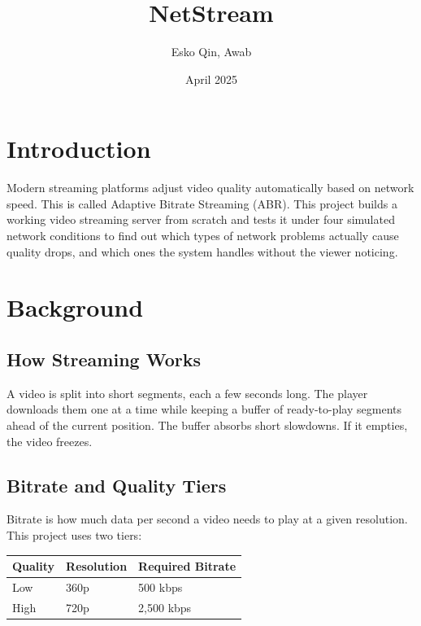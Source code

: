 \documentclass[12pt]{article}
\title{\textbf{NetStream}}
\author{Esko Qin, Awab}
\date{April 2025}
\begin{document}
\maketitle
\tableofcontents
\newpage

\section{Introduction}

Modern streaming platforms adjust video quality automatically based on network speed. This is called Adaptive Bitrate Streaming (ABR). This project builds a working video streaming server from scratch and tests it under four simulated network conditions to find out which types of network problems actually cause quality drops, and which ones the system handles without the viewer noticing.

\section{Background}

\subsection{How Streaming Works}

A video is split into short segments, each a few seconds long. The player downloads them one at a time while keeping a buffer of ready-to-play segments ahead of the current position. The buffer absorbs short slowdowns. If it empties, the video freezes.

\subsection{Bitrate and Quality Tiers}

Bitrate is how much data per second a video needs to play at a given resolution. This project uses two tiers:

\begin{center}
\begin{tabular}{lll}
\toprule
Quality & Resolution & Required Bitrate \\
\midrule
Low  & 360p & 500 kbps   \\
High & 720p & 2,500 kbps \\
\bottomrule
\end{tabular}
\end{center}
\end{document}
